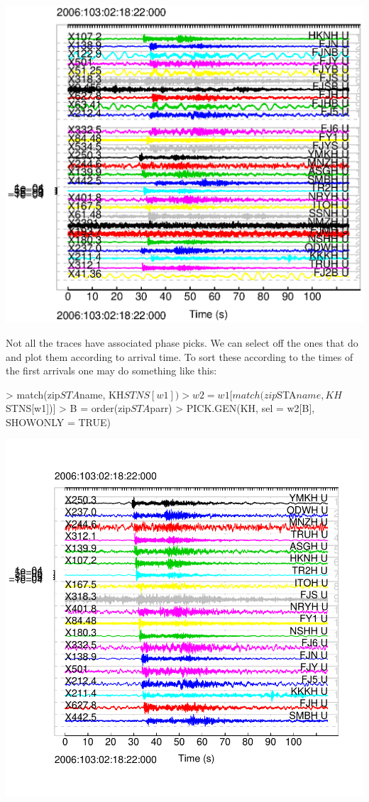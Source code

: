 \documentclass{article}
\begin{document}
\begin{Schunk}
\end{Schunk}
\includegraphics{WIN2R-010}

Not all the traces have associated phase picks.
We can select off the ones that do and plot them
according to arrival time.
To sort these according to the times of the first arrivals one may do something like this:

\begin{Schunk}
\begin{Sinput}
> match(zip$STA$name, KH$STNS[w1])
> w2 = w1[match(zip$STA$name, KH$STNS[w1])]
> B = order(zip$STA$parr)
> PICK.GEN(KH, sel = w2[B], SHOWONLY = TRUE)
\end{Sinput}
\end{Schunk}
\includegraphics{WIN2R-011}
\end{document}
